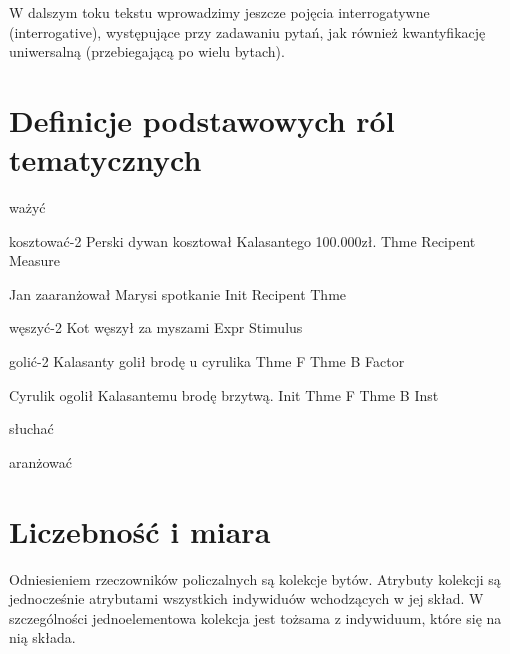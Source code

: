 \documentclass[a4paper,12pt]{article}
\begin{document}
W dalszym toku tekstu wprowadzimy jeszcze pojęcia interrogatywne (interrogative),
występujące przy zadawaniu pytań, jak również kwantyfikację uniwersalną 
(przebiegającą po wielu bytach).

\section{Definicje podstawowych ról tematycznych}

ważyć 


kosztować-2 
Perski dywan kosztował Kalasantego 100.000zł.
Thme                   Recipent    Measure


Jan zaaranżował Marysi spotkanie
Init            Recipent Thme

węszyć-2
Kot węszył za myszami
Expr       Stimulus

golić-2
Kalasanty golił brodę u cyrulika
Thme F          Thme B Factor

Cyrulik ogolił Kalasantemu brodę brzytwą.
Init           Thme F      Thme B Inst

słuchać 


aranżować


\section{Liczebność i miara}

Odniesieniem rzeczowników policzalnych są kolekcje bytów.
Atrybuty kolekcji są jednocześnie atrybutami wszystkich indywiduów wchodzących w jej skład.
W szczególności jednoelementowa kolekcja jest tożsama z indywiduum, które się na nią składa.
\end{document}
